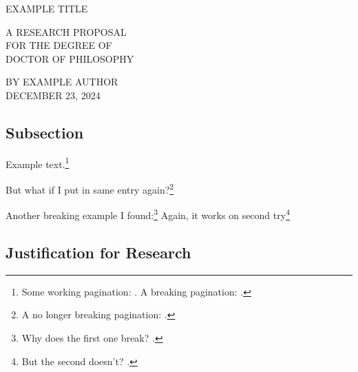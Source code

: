 \documentclass[A4,12pt]{article}
\begin{document}
\hypersetup{pageanchor=false}%
%
\thispagestyle{empty}%
\singlespacing
\begin{center}

  \vfill

  \doublespacing
  \MakeTextUppercase{
    Example Title
  }

  \vfill
  
  \singlespacing
  \MakeTextUppercase{
    A Research Proposal\\
     for the Degree of\\
     Doctor of Philosophy
  }

  \vfill

  \MakeTextUppercase{
    By Example Author\\
    December 23, 2024
  }
  
\end{center}
\restoregeometry
\hypersetup{pageanchor=true}%





\clearpage
{}


%


\subsection{Subsection}

  
Example text.\footnote{
  Some working pagination: \cites[497]{oswaltBookIsaiahChapters1998}[268-269]{kimReadingIsaiahLiterary2016}. 
  A breaking pagination: \cite[51-55]{bakerJubileeMillenniumHoly1998}. %
}

But what if I put in same entry again?\footnote{
  A no longer breaking pagination: \cite[51-55]{bakerJubileeMillenniumHoly1998}. %
} 


Another breaking example I found:\footnote{
  Why does the first one break? \cite[312]{akagiAcceptabilityPurityActs2024}.
}
Again, it works on second try\footnote{
  But the second doesn't? \cite[312]{akagiAcceptabilityPurityActs2024}.
}
\subsection{Justification for Research}\label{justification-for-research}%
\end{document}
